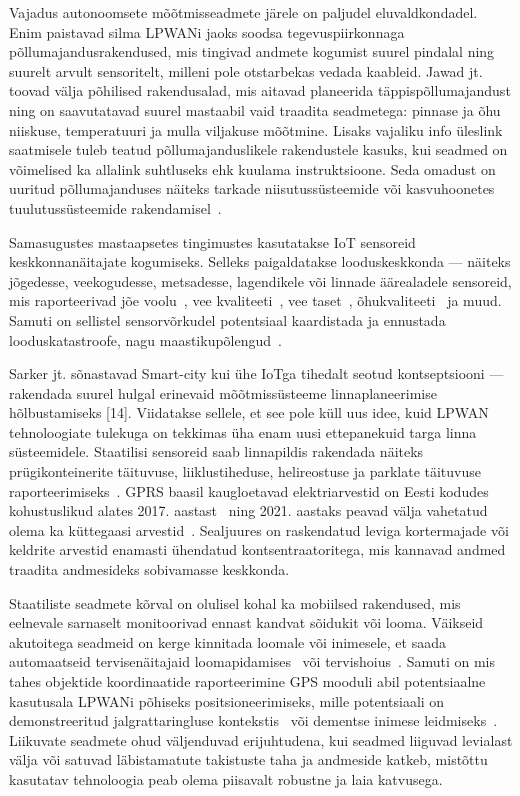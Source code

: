 \documentclass[12pt]{article}
\begin{document}
    Vajadus autonoomsete mõõtmisseadmete järele on paljudel eluvaldkondadel. Enim paistavad silma LPWANi jaoks soodsa tegevuspiirkonnaga põllumajandusrakendused, mis tingivad andmete kogumist suurel pindalal ning suurelt arvult sensoritelt, milleni pole otstarbekas vedada kaableid.
    Jawad jt.~\cite{jawad2017energy} toovad välja põhilised rakendusalad, mis aitavad planeerida täppispõllumajandust ning on saavutatavad suurel mastaabil vaid traadita seadmetega: pinnase ja õhu niiskuse, temperatuuri ja mulla viljakuse mõõtmine.
    Lisaks vajaliku info üleslink saatmisele tuleb teatud põllumajanduslikele rakendustele kasuks, kui seadmed on võimelised ka allalink suhtluseks ehk kuulama instruktsioone.
    Seda omadust on uuritud põllumajanduses näiteks tarkade niisutussüsteemide või kasvuhoonetes tuulutussüsteemide rakendamisel~\cite{abba2019design}.

    Samasugustes mastaapsetes tingimustes kasutatakse IoT sensoreid keskkonnanäitajate kogumiseks.
    Selleks paigaldatakse looduskeskkonda — näiteks jõgedesse, veekogudesse, metsadesse, lagendikele või linnade äärealadele sensoreid, mis raporteerivad jõe voolu~\cite{guibene2017evaluation}, vee kvaliteeti~\cite{liu2018solar}, vee taset~\cite{moreno2019rivercore}, õhukvaliteeti~\cite{knoll2018low} ja muud.
    Samuti on sellistel sensorvõrkudel potentsiaal kaardistada ja ennustada looduskatastroofe, nagu  maastikupõlengud~\cite{kang}.

    Sarker jt. sõnastavad Smart-city kui ühe IoTga tihedalt seotud kontseptsiooni — rakendada suurel hulgal erinevaid mõõtmissüsteeme linnaplaneerimise hõlbustamiseks [14].
    Viidatakse sellele, et see pole küll uus idee, kuid LPWAN tehnoloogiate tulekuga on tekkimas üha enam uusi ettepanekuid targa linna süsteemidele.
    Staatilisi sensoreid saab linnapildis rakendada näiteks prügikonteinerite täituvuse, liiklustiheduse, helireostuse ja parklate täituvuse raporteerimiseks~\cite{zanella}.
    GPRS baasil kaugloetavad elektriarvestid on Eesti kodudes kohustuslikud alates 2017. aastast~\cite{laurit} ning 2021. aastaks peavad välja vahetatud olema ka küttegaasi arvestid~\cite{gaas}.
    Sealjuures on raskendatud leviga kortermajade või keldrite arvestid enamasti ühendatud kontsentraatoritega, mis kannavad andmed traadita andmesideks sobivamasse keskkonda.

    Staatiliste seadmete kõrval on olulisel kohal ka mobiilsed rakendused, mis eelnevale sarnaselt monitoorivad ennast kandvat sõidukit või looma.
    Väikseid akutoitega seadmeid on kerge kinnitada loomale või inimesele, et saada automaatseid tervisenäitajaid loomapidamises~\cite{germani, liliu} või tervishoius~\cite{olatinwo, petajajarvi}.
    Samuti on mis tahes objektide koordinaatide raporteerimine GPS mooduli abil potentsiaalne kasutusala LPWANi põhiseks positsioneerimiseks, mille potentsiaali on demonstreeritud jalgrattaringluse kontekstis~\cite{kimpark} või dementse inimese leidmiseks~\cite{hadwen}.
    Liikuvate seadmete ohud väljenduvad erijuhtudena, kui seadmed liiguvad levialast välja või satuvad läbistamatute takistuste taha ja andmeside katkeb, mistõttu kasutatav tehnoloogia peab olema piisavalt robustne ja laia katvusega.
\end{document}

